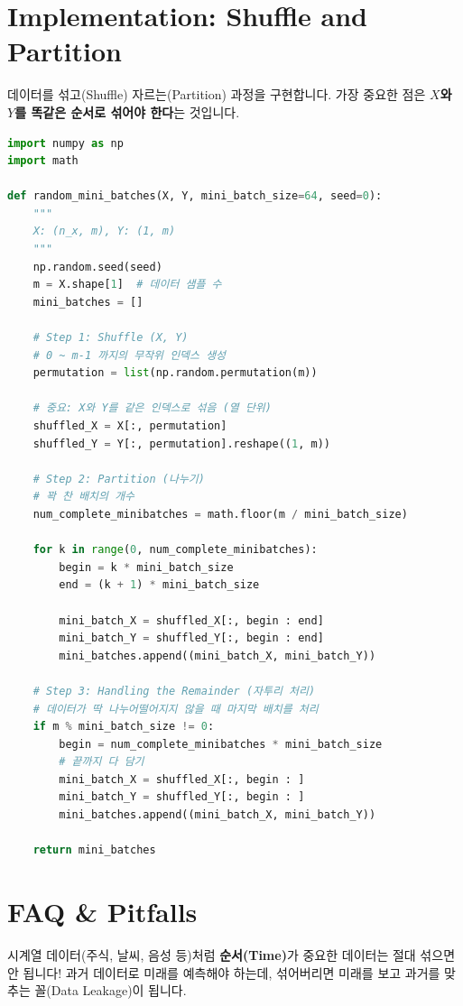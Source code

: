 \documentclass[11pt,a4paper]{book}
\theoremstyle{definition}
\begin{document}
\section{Implementation: Shuffle and Partition}

데이터를 섞고(Shuffle) 자르는(Partition) 과정을 구현합니다.
가장 중요한 점은 \textbf{$X$와 $Y$를 똑같은 순서로 섞어야 한다}는 것입니다.

\begin{lstlisting}[language=Python, caption=Random Mini-batches Generator, breaklines=true]
import numpy as np
import math

def random_mini_batches(X, Y, mini_batch_size=64, seed=0):
    """
    X: (n_x, m), Y: (1, m)
    """
    np.random.seed(seed)            
    m = X.shape[1]  # 데이터 샘플 수
    mini_batches = []
        
    # Step 1: Shuffle (X, Y)
    # 0 ~ m-1 까지의 무작위 인덱스 생성
    permutation = list(np.random.permutation(m))
    
    # 중요: X와 Y를 같은 인덱스로 섞음 (열 단위)
    shuffled_X = X[:, permutation]
    shuffled_Y = Y[:, permutation].reshape((1, m))

    # Step 2: Partition (나누기)
    # 꽉 찬 배치의 개수
    num_complete_minibatches = math.floor(m / mini_batch_size) 
    
    for k in range(0, num_complete_minibatches):
        begin = k * mini_batch_size
        end = (k + 1) * mini_batch_size
        
        mini_batch_X = shuffled_X[:, begin : end]
        mini_batch_Y = shuffled_Y[:, begin : end]
        mini_batches.append((mini_batch_X, mini_batch_Y))
    
    # Step 3: Handling the Remainder (자투리 처리)
    # 데이터가 딱 나누어떨어지지 않을 때 마지막 배치를 처리
    if m % mini_batch_size != 0:
        begin = num_complete_minibatches * mini_batch_size
        # 끝까지 다 담기
        mini_batch_X = shuffled_X[:, begin : ]
        mini_batch_Y = shuffled_Y[:, begin : ]
        mini_batches.append((mini_batch_X, mini_batch_Y))
    
    return mini_batches
\end{lstlisting}

\section{FAQ \& Pitfalls}

\begin{warningbox}[title={Shuffle 시 주의사항}]
시계열 데이터(주식, 날씨, 음성 등)처럼 \textbf{순서(Time)}가 중요한 데이터는 절대 섞으면 안 됩니다! 과거 데이터로 미래를 예측해야 하는데, 섞어버리면 미래를 보고 과거를 맞추는 꼴(Data Leakage)이 됩니다.
\end{warningbox}
\end{document}
